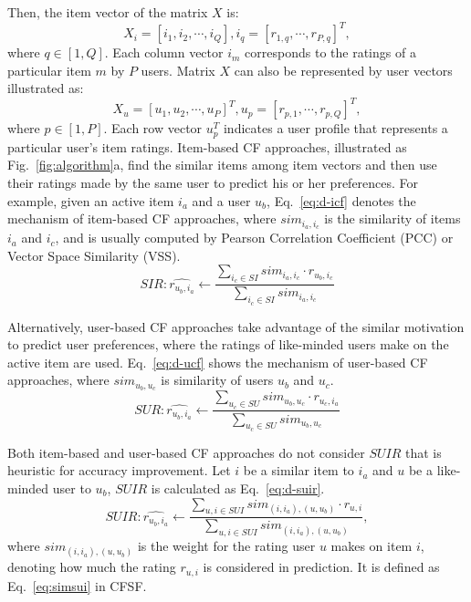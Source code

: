 Then, the item vector of the matrix $X$ is: $$X_i=[i_1, i_2, \cdots,
i_Q],  i_q=[r_{1,q}, \cdots, r_{P, q}]^T,$$ where $q \in [1,Q]$. Each
column vector $i_m$ corresponds to the ratings of a particular item $m$
by $P$ users. Matrix $X$ can also be represented by user vectors
illustrated as: $$X_u=[u_1, u_2, \cdots, u_P]^T, u_p=[r_{p,1}, \cdots,
r_{p, Q}]^T,$$ where $p \in [1,P]$. Each row vector $u_p^T$ indicates a
user profile that represents a particular user's item ratings.
Item-based CF approaches, illustrated as Fig.~\ref{fig:algorithm}a,
find the similar items among item vectors and then use their ratings
made by the same user to predict his or her preferences. For example,
given an active item $i_a$ and a user $u_b$, Eq.~\ref{eq:d-icf} denotes
the mechanism of item-based CF approaches, where $sim_{i_a, i_c}$ is
the similarity of items $i_a$ and $i_c$, and is usually computed by
Pearson Correlation Coefficient (PCC) or Vector Space Similarity (VSS).
\begin{equation}\label{eq:d-icf}
    SIR: \widehat{r_{u_b, i_a}} \longleftarrow
    \frac{\sum\limits_{i_c \in SI}{sim_{i_a, i_c}}
    \cdot r_{u_b, i_c}}{\sum\limits_{i_c \in SI}{sim_{i_a, i_c}}}
\end{equation}


Alternatively, user-based CF approaches take advantage of the similar
motivation to predict user preferences, where the ratings of
like-minded users make on the active item are used. Eq.~\ref{eq:d-ucf}
shows the mechanism of user-based CF approaches, where $sim_{u_b, u_c}$
is similarity of users $u_b$ and $u_c$.
\begin{equation}\label{eq:d-ucf}
    SUR: \widehat{r_{u_b, i_a}} \longleftarrow \frac{\sum\limits_{u_c \in SU}{sim_{u_b, u_c}}
    \cdot r_{u_c, i_a}}{\sum\limits_{u_c \in SU}{sim_{u_b, u_c}}}
\end{equation}

Both item-based and user-based CF approaches do not consider $SUIR$
that is heuristic for accuracy improvement. Let $i$ be a similar item
to $i_a$ and $u$ be a like-minded user to $u_b$, $SUIR$ is calculated
as Eq.~\ref{eq:d-suir}.
\begin{equation}\label{eq:d-suir}
    SUIR: \widehat{r_{u_b, i_a}} \longleftarrow \frac{\sum\limits_{u, i \in SUI}
    {sim_{(i, i_a), (u, u_b)} \cdot r_{u, i}}}{\sum\limits_{u, i \in SUI}{sim_{(i, i_a), (u, u_b)}}},
\end{equation}
where $sim_{(i, i_a), (u, u_b)}$ is the weight for the rating user $u$
makes on item $i$, denoting how much the rating $r_{u, i}$ is
considered in prediction. It is defined as Eq.~\ref{eq:simsui} in CFSF.


